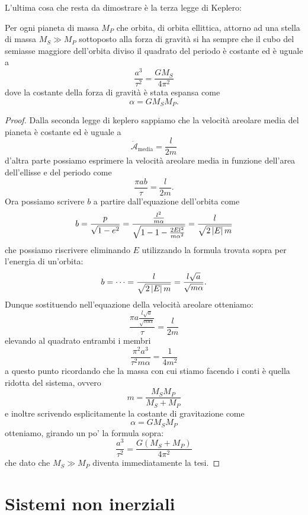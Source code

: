 \documentclass[11pt]{scrartcl}
\begin{document}
	L'ultima cosa che resta da dimostrare è la terza legge di Keplero:
	\begin{theorem}
		Per ogni pianeta di massa $M_P$ che orbita, di orbita ellittica, attorno ad una stella di massa $M_S\gg M_P$ sottoposto alla forza di gravità si ha sempre che il cubo del semiasse maggiore dell'orbita diviso il quadrato del periodo è costante ed è uguale a 
		$$\frac{a^3}{\tau^2}=\frac{GM_S}{4\pi^2}$$
		dove la costante della forza di gravità è stata espansa come
		$$\alpha=GM_SM_P.$$
	\end{theorem}
	\begin{proof}
		Dalla seconda legge di keplero sappiamo che la velocità areolare media del pianeta è costante ed è uguale a 
		$$\dot{\mathcal{A}}_\text{media}=\frac{l}{2m}$$
		d'altra parte possiamo esprimere la velocità areolare media in funzione dell'area dell'ellisse e del periodo come
		$$\frac{\pi ab}{\tau}=\frac{l}{2m}.$$
		Ora possiamo scrivere $b$ a partire dall'equazione dell'orbita come
		$$b=\frac{p}{\sqrt{1-e^2}}=\frac{\frac{l^2}{m\alpha}}{\sqrt{1-1-\frac{2El^2}{m\alpha^2}}}=\frac{l}{\sqrt{2\left\lvert E \right\rvert m}}$$
		che possiamo riscrivere eliminando $E$ utilizzando la formula trovata sopra per l'energia di un'orbita:
		$$b=\dots=\frac{l}{\sqrt{2\left\lvert E \right\rvert m}}=\frac{l\sqrt{a}}{\sqrt{m\alpha}}.$$
		Dunque sostituendo nell'equazione della velocità areolare otteniamo:
		$$\frac{\pi a\frac{l\sqrt{a}}{\sqrt{m\alpha}}}{\tau}=\frac{l}{2m}$$
		elevando al quadrato entrambi i membri
		$$\frac{\pi^2 a^3}{\tau^2 m\alpha}=\frac{1}{4m^2}$$
		a questo punto ricordando che la massa con cui stiamo facendo i conti è quella ridotta del sistema, ovvero
		$$m=\frac{M_SM_P}{M_S+M_P}$$
		e inoltre scrivendo esplicitamente la costante di gravitazione come
		$$\alpha=GM_SM_P$$
		otteniamo, girando un po' la formula sopra:
		$$\frac{a^3}{\tau^2}=\frac{G(M_S+M_P)}{4\pi^2}$$
		che dato che $M_S\gg M_P$ diventa immediatamente la tesi.
	\end{proof}
	\newpage
	
	\section{Sistemi non inerziali}
	
\end{document}
